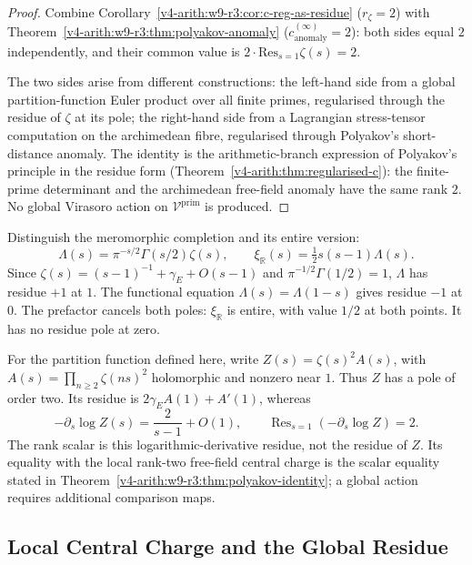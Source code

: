 \begin{proof}
Combine Corollary~\ref{v4-arith:w9-r3:cor:c-reg-as-residue} (\(r_{\zeta}=2\))
with Theorem~\ref{v4-arith:w9-r3:thm:polyakov-anomaly}
(\(c^{(\infty)}_{\mathrm{anomaly}}=2\)): both sides equal \(2\)
independently, and their common value is
\(2\cdot\mathrm{Res}_{s=1}\zeta(s)=2\).

The two sides arise from different constructions: the left-hand side
from a global partition-function Euler product over all finite primes,
regularised through the residue of \(\zeta\) at its pole; the
right-hand side from a Lagrangian stress-tensor computation on the
archimedean fibre, regularised through Polyakov's short-distance anomaly. The identity is the arithmetic-branch
expression of Polyakov's principle in the residue form
(Theorem~\ref{v4-arith:thm:regularised-c}): the finite-prime determinant and
the archimedean free-field anomaly have the same rank \(2\). No global
Virasoro action on \(\mathcal{V}^{\mathrm{prim}}\) is produced.
\end{proof}

\begin{remark}
\label{v4-arith:w9-r3:rem:global-compatibility}
Distinguish the meromorphic completion and its entire version:
\[
 \Lambda(s)=\pi^{-s/2}\Gamma(s/2)\zeta(s),\qquad
 \xi_{\mathbb R}(s)=\tfrac12s(s-1)\Lambda(s).
\]
Since \(\zeta(s)=(s-1)^{-1}+\gamma_E+O(s-1)\) and
\(\pi^{-1/2}\Gamma(1/2)=1\), \(\Lambda\) has residue \(+1\)
at \(1\). The functional equation \(\Lambda(s)=\Lambda(1-s)\)
gives residue \(-1\) at \(0\). The prefactor cancels both poles:
\(\xi_{\mathbb R}\) is entire, with value \(1/2\) at both points.
It has no residue pole at zero.

For the partition function defined here, write
\(Z(s)=\zeta(s)^2 A(s)\), with
\(A(s)=\prod_{n\geq2}\zeta(ns)^2\) holomorphic and nonzero near
\(1\). Thus \(Z\) has a pole of order two. Its residue is
\(2\gamma_E A(1)+A'(1)\), whereas
\[
 -\partial_s\log Z(s)=\frac2{s-1}+O(1),\qquad
 \operatorname{Res}_{s=1}(-\partial_s\log Z)=2.
\]
The rank scalar is this logarithmic-derivative residue, not the
residue of \(Z\). Its equality with the local rank-two free-field
central charge is the scalar equality stated in
Theorem~\ref{v4-arith:w9-r3:thm:polyakov-identity}; a global action
requires additional comparison maps.
\end{remark}

\subsection{Local Central Charge and the Global Residue}
\label{v4-arith:w9-r3:independence}

